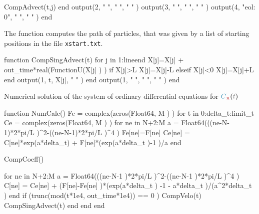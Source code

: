\documentclass[10pt,fleqn, %
reqno,a4paper]{article}
\makeatletter
\def\mathcolor#1#{\@mathcolor{#1}}
\def\@mathcolor#1#2#3{%
        \protect\leavevmode
        \begingroup\color#1{#2}#3\endgroup
}
\newcommand{\nt}{\mathcolor{gray}{t}}
\newcommand{\nn}{\mathcolor{red!70!black}{n}}
\newcommand{\nC}{\mathcolor{cyan!70!black}{C}}
\makeatother
\begin{document}
      CompAdvect(t,j)
   end
   output(2, " ", " ", " " )
   output(3, " ", " ", " " )
   output(4, "eol: 0", " ", " " )
end

\nwendcode{}\nwdocspar
The function computes the path of particles, that was given by a list of starting positions in the file \texttt{xstart.txt}.

\nwenddocs{}\endmoddef\nwstartdeflinemarkup{}\nwenddeflinemarkup
function CompSingAdvect(t)
   for j in 1:lineend
      X[j]=X[j] + out_time*real(FunctionU(X[j] ) )
      if X[j]>L
         X[j]=X[j]-L
      elseif X[j]<0
         X[j]=X[j]+L
      end
      output(1, t, X[j], " " )
   end
   output(1, " ", " ", " " )
end

\nwendcode{}\nwdocspar
Numerical solution of the system of ordinary differential equations for $ \nC_{\nn} (\nt) $

\nwenddocs{}\endmoddef\nwstartdeflinemarkup{}\nwenddeflinemarkup
function NumCalc()
   Fe = complex(zeros(Float64, M ) )
   for t in 0:delta_t:limit_t
      Ce = complex(zeros(Float64, M ) )
      for ne in N+2:M
         a = Float64(((ne-N-1)*2*pi/L )^2-((ne-N-1)*2*pi/L )^4 )
         Fe[ne]=F[ne]
         Ce[ne] = C[ne]*exp(a*delta_t) + F[ne]*(exp(a*delta_t )-1 )/a
      end
      
      CompCoeff()
      
      for ne in N+2:M
         a = Float64(((ne-N-1 )*2*pi/L )^2-((ne-N-1 )*2*pi/L )^4 )
         C[ne] = Ce[ne] + (F[ne]-Fe[ne] )*(exp(a*delta_t ) -1 - a*delta_t )/(a^2*delta_t )
      end
      if (trunc(mod(t*1e4, out_time*1e4)) == 0 )
         CompVelo(t)
         CompSingAdvect(t)
      end
   end
end

\nwendcode{}\nwdocspar
\end{document}
